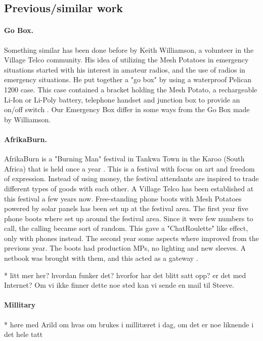 \subsection{Previous/similar work}
\paragraph{Go Box.} Something similar has been done before by Keith Williamson, a volunteer in the Village Telco community. His idea of utilizing the Mesh Potatoes in emergency situations started with his interest in amateur radios, and the use of radios in emergency situations. He put together a "go box" by using a waterproof Pelican 1200 case. This case contained a bracket holding the Mesh Potato, a rechargeable Li-Ion or Li-Poly battery, telephone handset and junction box to provide an on/off switch \cite{keith}. Our Emergency Box differ in some ways from the Go Box made by Williamson. 

\paragraph{AfrikaBurn.}
AfrikaBurn is a "Burning Man" festival in Tankwa Town in the Karoo (South Africa) that is held once a year \cite{whatisafrikaburn}. This is a festival with focus on art and freedom of expression. Instead of using money, the festival attendants are inspired to trade different types of goods with each other. A Village Telco has been established at this festival a few years now. Free-standing phone boots with Mesh Potatoes powered by solar panels has been set up at the festival area. The first year five phone boots where set up around the festival area. Since it were few numbers to call, the calling became sort of random. This gave a  "ChatRoulette" like effect, only with phones instead. The second year some aspects where improved from the previous year. The boots had production MPs, no lighting and new sleeves. A netbook was brought with them, and this acted as a gateway \cite{africaburnforavillagetelco,africaburnsagainforavillagetelco}. 

* litt mer her? hvordan funker det? hvorfor har det blitt satt opp? er det med Internet? Om vi ikke finner dette noe sted kan vi sende en mail til Steeve.

\paragraph{Millitary}
* høre med Arild om hvas om brukes i millitæret i dag, om det er noe liknende i det hele tatt

